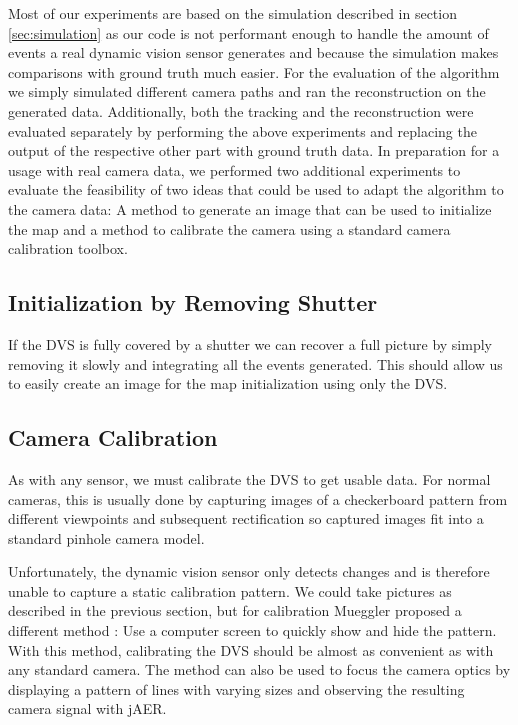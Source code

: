 Most of our experiments are based on the simulation described in section
\ref{sec:simulation} as our code is not performant enough to handle the amount
of events a real dynamic vision sensor generates and because the simulation
makes comparisons with ground truth much easier.
For the evaluation of the algorithm we simply simulated different camera paths
and ran the reconstruction on the generated data.
Additionally, both the tracking and the reconstruction were evaluated separately
by performing the above experiments and replacing the output of the respective
other part with ground truth data.
In preparation for a usage with real camera data, we performed two additional
experiments to evaluate the feasibility of two ideas that could be used to adapt
the algorithm to the camera data:
A method to generate an image that can be used to initialize the map and a method
to calibrate the camera using a standard camera calibration toolbox.

\subsection{Initialization by Removing Shutter}
\label{sec:shutter_removal}
If the DVS is fully covered by a shutter we can recover a full picture by
simply removing it slowly and integrating all the events generated. This should allow
us to easily create an image for the map initialization using only the DVS.

\subsection{Camera Calibration}
\label{sec:camera_calibration}
As with any sensor, we must calibrate the DVS to get usable data. For normal
cameras, this is usually done by capturing images of a checkerboard pattern from
different viewpoints and subsequent rectification so captured images fit into a
standard pinhole camera model.

Unfortunately, the dynamic vision sensor only detects changes and is therefore unable to
capture a static calibration pattern. We could take pictures as described in
the previous section, but for calibration Mueggler \etal proposed a different method \cite{mueggler2014event}:
Use a computer screen to quickly show and hide the pattern. With this method,
calibrating the DVS should be almost as convenient as with any standard camera.
The method can also be used to focus the camera optics by displaying a pattern
of lines with varying sizes and observing the resulting camera signal with jAER.
